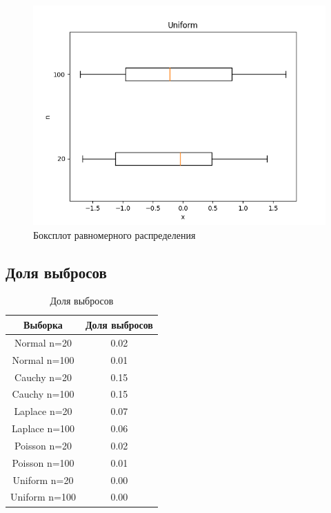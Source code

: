 \begin{figure}[H]
	\centering
	\includegraphics[scale=0.65]{uniform_boxplot.png}
	\caption{Боксплот равномерного распределения}
\end{figure}

\subsection{Доля выбросов}

\begin{table}[H]
	\begin{center}
		\begin{tabular}{|c|c|}
			\hline
			Выборка & Доля выбросов \\
			\hline\hline
			Normal n=20 & 0.02\\
			\hline 
			Normal n=100 & 0.01\\
			\hline
			Cauchy n=20 & 0.15\\
			\hline 
			Cauchy n=100 & 0.15\\
			\hline
			Laplace n=20 & 0.07\\
			\hline 
			Laplace n=100 & 0.06\\
			\hline
			Poisson n=20 & 0.02\\
			\hline 
			Poisson n=100 & 0.01\\
			\hline
			Uniform n=20 & 0.00\\
			\hline 
			Uniform n=100 & 0.00\\
			\hline
		\end{tabular}
	\end{center}
    \caption{Доля выбросов}
\end{table}


